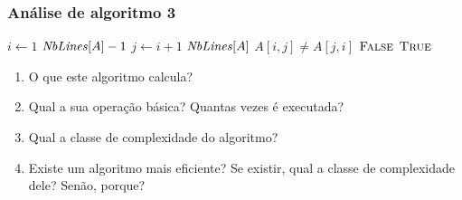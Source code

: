 \documentclass[handout]{beamer}
\begin{document}
\begin{frame}
\frametitle{Análise de algoritmo 3}

\begin{problem}
\begin{codebox}
\li \For $i \gets 1$ \To $\id{NbLines}[A]-1$
\li \Do
\li   \For $j \gets i+1$ \To $\id{NbLines}[A]$
\li   \Do
\li     \If $A[i,j] \neq A[j,i]$  \Return $\textnormal{\scshape False}$
      \End
    \End
\li \Return $\textnormal{\scshape True}$
\end{codebox}
\begin{enumerate}
\item O que este algoritmo calcula?
\item Qual a sua operação básica? Quantas vezes é executada?
\item Qual a classe de complexidade do algoritmo?
\item Existe um algoritmo mais eficiente? Se existir, qual a classe de complexidade dele? Senão, porque?
\end{enumerate}
\end{problem}
\end{frame}
\end{document}
